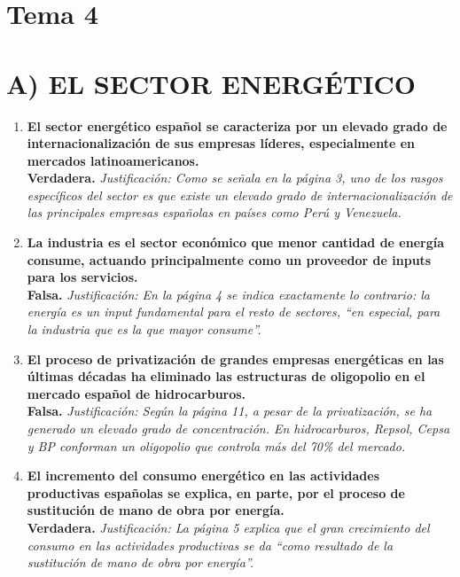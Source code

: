 \section{Tema 4}
\section*{A) EL SECTOR ENERGÉTICO}

\begin{enumerate}[label=\textbf{\arabic*.}]

    \item \textbf{El sector energético español se caracteriza por un elevado grado de internacionalización de sus empresas líderes, especialmente en mercados latinoamericanos.} \\
    \textbf{Verdadera.} \textit{Justificación: Como se señala en la página 3, uno de los rasgos específicos del sector es que existe un elevado grado de internacionalización de las principales empresas españolas en países como Perú y Venezuela.}

    \item \textbf{La industria es el sector económico que menor cantidad de energía consume, actuando principalmente como un proveedor de inputs para los servicios.} \\
    \textbf{Falsa.} \textit{Justificación: En la página 4 se indica exactamente lo contrario: la energía es un input fundamental para el resto de sectores, ``en especial, para la industria que es la que mayor consume''.}

    \item \textbf{El proceso de privatización de grandes empresas energéticas en las últimas décadas ha eliminado las estructuras de oligopolio en el mercado español de hidrocarburos.} \\
    \textbf{Falsa.} \textit{Justificación: Según la página 11, a pesar de la privatización, se ha generado un elevado grado de concentración. En hidrocarburos, Repsol, Cepsa y BP conforman un oligopolio que controla más del 70\% del mercado.}

    \item \textbf{El incremento del consumo energético en las actividades productivas españolas se explica, en parte, por el proceso de sustitución de mano de obra por energía.} \\
    \textbf{Verdadera.} \textit{Justificación: La página 5 explica que el gran crecimiento del consumo en las actividades productivas se da ``como resultado de la sustitución de mano de obra por energía''.}


\end{enumerate}
